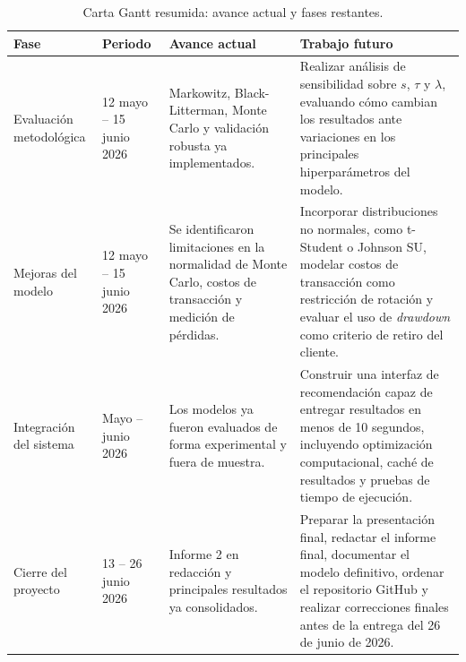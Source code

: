 \begin{table}[h]
\centering
\caption{Carta Gantt resumida: avance actual y fases restantes.}
\label{tab:plan_trabajo_futuro}
\scriptsize
\begin{tabular}{@{}p{}p{}p{}p{}@{}}
\toprule
Fase & Periodo & Avance actual & Trabajo futuro \\
\midrule
Evaluaci\'on metodol\'ogica &
12 mayo -- 15 junio 2026 &
Markowitz, Black-Litterman, Monte Carlo y validaci\'on robusta ya implementados. &
Realizar an\'alisis de sensibilidad sobre $s$, $\tau$ y $\lambda$, evaluando c\'omo cambian los resultados ante variaciones en los principales hiperpar\'ametros del modelo. \\
\addlinespace

Mejoras del modelo &
12 mayo -- 15 junio 2026 &
Se identificaron limitaciones en la normalidad de Monte Carlo, costos de transacci\'on y medici\'on de p\'erdidas. &
Incorporar distribuciones no normales, como t-Student o Johnson SU, modelar costos de transacci\'on como restricci\'on de rotaci\'on y evaluar el uso de \textit{drawdown} como criterio de retiro del cliente. \\
\addlinespace

Integraci\'on del sistema &
Mayo -- junio 2026 &
Los modelos ya fueron evaluados de forma experimental y fuera de muestra. &
Construir una interfaz de recomendaci\'on capaz de entregar resultados en menos de 10 segundos, incluyendo optimizaci\'on computacional, cach\'e de resultados y pruebas de tiempo de ejecuci\'on. \\
\addlinespace

Cierre del proyecto &
13 -- 26 junio 2026 &
Informe 2 en redacci\'on y principales resultados ya consolidados. &
Preparar la presentaci\'on final, redactar el informe final, documentar el modelo definitivo, ordenar el repositorio GitHub y realizar correcciones finales antes de la entrega del 26 de junio de 2026. \\
\bottomrule
\end{tabular}
\end{table}
